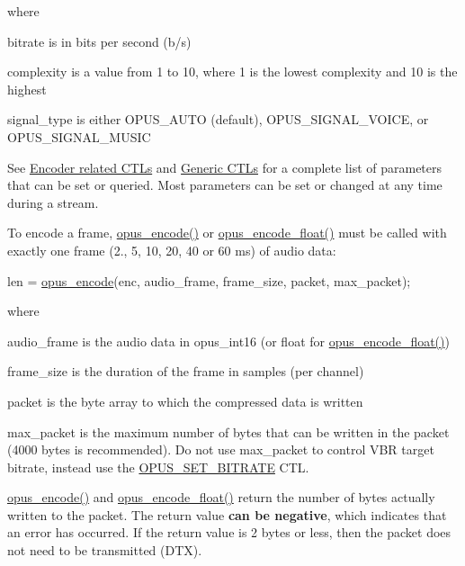where

\begin{DoxyItemize}
\item bitrate is in bits per second (b/s) \item complexity is a value from 1 to 10, where 1 is the lowest complexity and 10 is the highest \item signal\+\_\+type is either O\+P\+U\+S\+\_\+\+A\+U\+TO (default), O\+P\+U\+S\+\_\+\+S\+I\+G\+N\+A\+L\+\_\+\+V\+O\+I\+CE, or O\+P\+U\+S\+\_\+\+S\+I\+G\+N\+A\+L\+\_\+\+M\+U\+S\+IC\end{DoxyItemize}
See \hyperlink{group__opus__encoderctls}{Encoder related C\+T\+Ls} and \hyperlink{group__opus__genericctls}{Generic C\+T\+Ls} for a complete list of parameters that can be set or queried. Most parameters can be set or changed at any time during a stream.

To encode a frame, \hyperlink{group__opus__encoder_gad2d6bf6a9ffb6674879d7605ed073e25}{opus\+\_\+encode()} or \hyperlink{group__opus__encoder_ga4ae9905859cd241ef4bb5c59cd5e5309}{opus\+\_\+encode\+\_\+float()} must be called with exactly one frame (2., 5, 10, 20, 40 or 60 ms) of audio data\+: 
\begin{DoxyCode}
len = \hyperlink{group__opus__encoder_gad2d6bf6a9ffb6674879d7605ed073e25}{opus\_encode}(enc, audio\_frame, frame\_size, packet, max\_packet);
\end{DoxyCode}


where 
\begin{DoxyItemize}
\item audio\+\_\+frame is the audio data in opus\+\_\+int16 (or float for \hyperlink{group__opus__encoder_ga4ae9905859cd241ef4bb5c59cd5e5309}{opus\+\_\+encode\+\_\+float()}) 
\item frame\+\_\+size is the duration of the frame in samples (per channel) 
\item packet is the byte array to which the compressed data is written 
\item max\+\_\+packet is the maximum number of bytes that can be written in the packet (4000 bytes is recommended). Do not use max\+\_\+packet to control V\+BR target bitrate, instead use the \hyperlink{group__opus__encoderctls_ga0bb51947e355b33d0cb358463b5101a7}{O\+P\+U\+S\+\_\+\+S\+E\+T\+\_\+\+B\+I\+T\+R\+A\+TE} C\+TL. 
\end{DoxyItemize}

\hyperlink{group__opus__encoder_gad2d6bf6a9ffb6674879d7605ed073e25}{opus\+\_\+encode()} and \hyperlink{group__opus__encoder_ga4ae9905859cd241ef4bb5c59cd5e5309}{opus\+\_\+encode\+\_\+float()} return the number of bytes actually written to the packet. The return value {\bfseries can be negative}, which indicates that an error has occurred. If the return value is 2 bytes or less, then the packet does not need to be transmitted (D\+TX).


